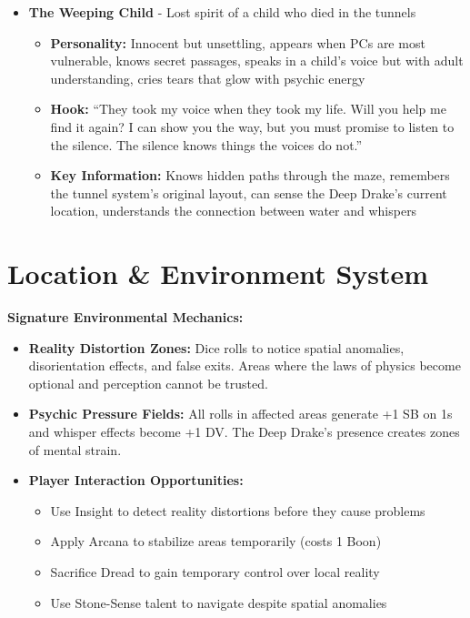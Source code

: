 \documentclass[11pt]{article}
\begin{document}
\begin{itemize}
\begin{itemize}
  \item \textbf{Key Information:} Knows current tunnel layouts and dangers, remembers everyone who has died in the depths, can provide shortcuts through dangerous areas, offers warnings about future threats
  \end{itemize}
\item \textbf{The Weeping Child} - Lost spirit of a child who died in the tunnels
  \begin{itemize}
  \item \textbf{Personality:} Innocent but unsettling, appears when PCs are most vulnerable, knows secret passages, speaks in a child's voice but with adult understanding, cries tears that glow with psychic energy
  \item \textbf{Hook:} ``They took my voice when they took my life. Will you help me find it again? I can show you the way, but you must promise to listen to the silence. The silence knows things the voices do not.''
  \item \textbf{Key Information:} Knows hidden paths through the maze, remembers the tunnel system's original layout, can sense the Deep Drake's current location, understands the connection between water and whispers
  \end{itemize}
\end{itemize}

\section{Location \& Environment System}

\textbf{Signature Environmental Mechanics:}
\begin{itemize}
\item \textbf{Reality Distortion Zones:} Dice rolls to notice spatial anomalies, disorientation effects, and false exits. Areas where the laws of physics become optional and perception cannot be trusted.
\item \textbf{Psychic Pressure Fields:} All rolls in affected areas generate +1 SB on 1s and whisper effects become +1 DV. The Deep Drake's presence creates zones of mental strain.
\item \textbf{Player Interaction Opportunities:}
  \begin{itemize}
  \item Use Insight to detect reality distortions before they cause problems
  \item Apply Arcana to stabilize areas temporarily (costs 1 Boon)
  \item Sacrifice Dread to gain temporary control over local reality
  \item Use Stone-Sense talent to navigate despite spatial anomalies
  \end{itemize}
\end{itemize}
\end{document}
